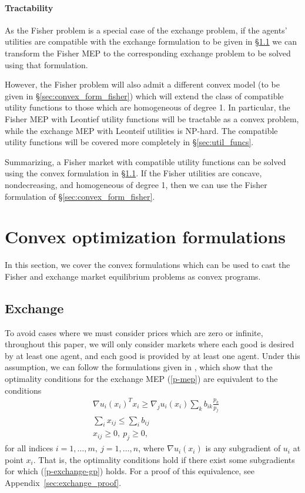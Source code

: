 \documentclass[12pt]{article}
\begin{document}
\paragraph{Tractability}

As the Fisher problem is a special case of the exchange problem, if the agents'
utilities are compatible with the exchange formulation to be given in
\S\ref{sec:convex_form_exchange} we can transform the Fisher MEP to the
corresponding exchange problem to be solved using that formulation.

However, the Fisher problem will also admit a different convex model (to be
given in \S\ref{sec:convex_form_fisher}) which will extend the class of
compatible utility functions to those which are homogeneous of degree 1.
In particular, the Fisher MEP with
Leontief utility functions will be tractable as a convex problem, while the
exchange MEP with Leonteif utilities is NP-hard. The compatible utility
functions will be covered more completely in \S\ref{sec:util_funcs}.

Summarizing, a Fisher market with compatible utility functions can be solved
using the convex formulation in \S\ref{sec:convex_form_exchange}. If the Fisher
utilities are concave, nondecreasing, and homogeneous of degree 1, then we can
use the Fisher formulation of \S\ref{sec:convex_form_fisher}.


\section{Convex optimization formulations}
\label{sec:convex_form}
In this section, we cover the convex formulations which can be used to cast
the Fisher and exchange market equilibrium problems as convex programs.

\subsection{Exchange}
\label{sec:convex_form_exchange}

To avoid cases where we must consider prices which are zero or infinite,
throughout this paper, we will only consider markets where each good is desired
by at least one agent, and each good is provided by at least one agent. Under
this assumption, we can follow the formulations given in
\cite{jain2007polynomial, chen2007note, nenakov1983algorithm}, which show that
the optimality conditions for the exchange MEP (\ref{p-mep}) are equivalent to
the conditions
\begin{equation}
\begin{array}{ll}
& \nabla u_i(x_i)^T x_i \geq  \nabla_j u_i(x_i) \sum_k b_{ik} \frac{p_k}{p_j}\\
& \sum_i x_{ij} \leq \sum_i b_{ij}\\
& x_{ij} \geq 0,\ p_j \geq 0,
\end{array}
\label{p-exchange-gp}
\end{equation}
for all indices $i=1,\ldots,m,\ j=1,\ldots,n$, where $\nabla u_i(x_i)$
is any subgradient of $u_i$ at point $x_i$. That is, the optimality
conditions hold if there exist some subgradients for which (\ref{p-exchange-gp})
holds.
For a proof of this equivalence, see Appendix~\ref{sec:exchange_proof}.
\end{document}
